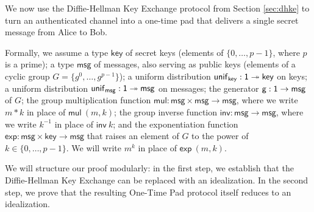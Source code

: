 \renewcommand{\key}{\mathsf{key}}
\renewcommand{\msg}{\mathsf{msg}}
\renewcommand{\unif}{\mathsf{unif}}
\renewcommand{\gen}{\mathsf{g}}
\newcommand{\mul}{\mathsf{mul}}
\newcommand{\inv}{\mathsf{inv}}
\renewcommand{\exp}{\mathsf{exp}}
\renewcommand{\id}{\mathsf{id}}
\renewcommand{\adv}{\mathsf{adv}}
\renewcommand{\net}{\mathsf{net}}
\renewcommand{\Alice}{\mathsf{Alice}}
\renewcommand{\Bob}{\mathsf{Bob}}
\newcommand{\dhke}{\mathsf{DHKE}}
\renewcommand{\In}{\mathsf{In}}
\renewcommand{\Out}{\mathsf{Out}}
\renewcommand{\Key}{\mathsf{Key}}
\renewcommand{\Send}{\mathsf{Send}}
\renewcommand{\Recv}{\mathsf{Recv}}
\renewcommand{\LeakMsgRcvd}{\mathsf{LeakMsgRcvd}}
\renewcommand{\OkMsg}{\mathsf{OkMsg}}
\renewcommand{\OkKey}{\mathsf{OkKey}}
\renewcommand{\LeakCtxt}{\mathsf{LeakCtxt}}
\renewcommand{\OkCtxt}{\mathsf{OkCtxt}}
\renewcommand{\PublicKey}{\mathsf{PublicKey}}
\renewcommand{\LeakPublicKey}{\mathsf{LeakPublicKey}}
\renewcommand{\OkPublicKey}{\mathsf{OkPublicKey}}

We now use the Diffie-Hellman Key Exchange protocol from Section \ref{sec:dhke} to turn an authenticated channel into a one-time pad that delivers a single secret message from Alice to Bob.

Formally, we assume a type $\key$ of secret keys (elements of $\{0,\ldots,p-1\}$, where $p$ is a prime); a type $\msg$ of messages, also serving as public keys (elements of a cyclic group $G = \{g^0,\ldots,g^{p-1}\}$); a uniform distribution $\unif_\key : \one \twoheadrightarrow \key$ on keys; a uniform distribution $\unif_\msg : \one \twoheadrightarrow \msg$ on messages; the generator $\gen : \one \rightarrow \msg$ of $G$; the group multiplication function $\mul : \msg \times \msg \rightarrow \msg$, where we write $m * k$ in place of $\mul \ (m,k)$; the group inverse function $\inv : \msg \rightarrow \msg$, where we write $k^{-1}$ in place of $\inv \ k$; and the exponentiation function $\exp : \msg \times \key \rightarrow \msg$ that raises an element of $G$ to the power of $k \in \{0,\ldots,p-1\}$. We will write $m^k$ in place of $\exp \ (m,k)$.

We will structure our proof modularly: in the first step, we establish that the Diffie-Hellman Key Exchange can be replaced with an idealization. In the second step, we prove that the resulting One-Time Pad protocol itself reduces to an idealization.

